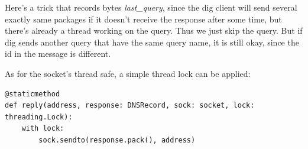 \documentclass[onecolumn, oneside, ctexart]{SUSTechHomework}
\begin{document}
\par Here's a trick that records bytes \emph{last\_query}, since the dig client will send several exactly same packages if it doesn't receive the response after some time, but there's already a thread working on the query. Thus we just skip the query. But if dig sends another query that have the same query name, it is still okay, since the id in the message is different.

\par As for the socket's thread safe, a simple thread lock can be applied:
\begin{verbatim}
@staticmethod
def reply(address, response: DNSRecord, sock: socket, lock: threading.Lock):
    with lock:
        sock.sendto(response.pack(), address)
\end{verbatim}
\end{document}

